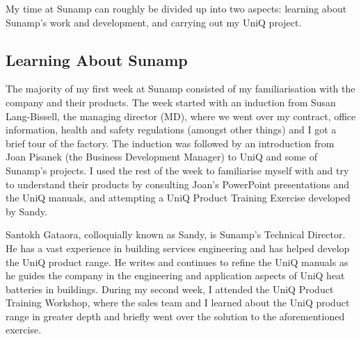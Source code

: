 My time at Sunamp can roughly be divided up into two aspects: learning about Sunamp's work and development, and
carrying out my UniQ project.

\subsection{Learning About Sunamp}

The majority of my first week at Sunamp consisted of my familiarisation with the company and their products.
The week started with an induction from Susan Lang-Bissell, the managing director (MD), where we went over my contract, office information, health and safety regulations (amongst other things) and I got a brief tour of the factory.
The induction was followed by an introduction from Joan Pisanek (the Business Development Manager) to UniQ and some of Sunamp's projects.
I used the rest of the week to familiarise myself with and try to understand their products by consulting Joan's PowerPoint presentations and the UniQ manuals,
and attempting a UniQ Product Training Exercise developed by Sandy.

Santokh Gataora, colloquially known as Sandy, is Sunamp's Technical Director.
He has a vast experience in building services engineering and has helped develop the UniQ product range.
He writes and continues to refine the UniQ manuals as he guides the company in the engineering and application aspects of UniQ heat batteries in buildings.
During my second week, I attended the UniQ Product Training Workshop, where the sales team and I learned about the UniQ product range in greater depth and briefly went over the solution to the aforementioned exercise.


